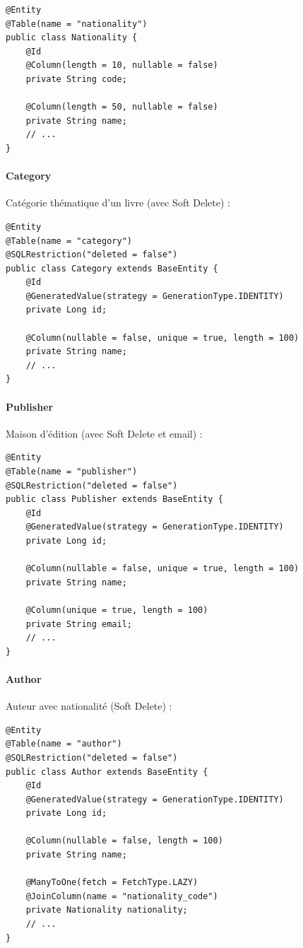 \documentclass[12pt,a4paper,twoside]{report}
\begin{document}
\begin{lstlisting}[caption=Entité Nationality]
@Entity
@Table(name = "nationality")
public class Nationality {
    @Id
    @Column(length = 10, nullable = false)
    private String code;

    @Column(length = 50, nullable = false)
    private String name;
    // ...
}
\end{lstlisting}

\paragraph{Category} Catégorie thématique d'un livre (avec Soft Delete) :

\begin{lstlisting}[caption=Entité Category]
@Entity
@Table(name = "category")
@SQLRestriction("deleted = false")
public class Category extends BaseEntity {
    @Id
    @GeneratedValue(strategy = GenerationType.IDENTITY)
    private Long id;

    @Column(nullable = false, unique = true, length = 100)
    private String name;
    // ...
}
\end{lstlisting}

\paragraph{Publisher} Maison d'édition (avec Soft Delete et email) :

\begin{lstlisting}[caption=Entité Publisher]
@Entity
@Table(name = "publisher")
@SQLRestriction("deleted = false")
public class Publisher extends BaseEntity {
    @Id
    @GeneratedValue(strategy = GenerationType.IDENTITY)
    private Long id;

    @Column(nullable = false, unique = true, length = 100)
    private String name;

    @Column(unique = true, length = 100)
    private String email;
    // ...
}
\end{lstlisting}

\paragraph{Author} Auteur avec nationalité (Soft Delete) :

\begin{lstlisting}[caption=Entité Author]
@Entity
@Table(name = "author")
@SQLRestriction("deleted = false")
public class Author extends BaseEntity {
    @Id
    @GeneratedValue(strategy = GenerationType.IDENTITY)
    private Long id;

    @Column(nullable = false, length = 100)
    private String name;

    @ManyToOne(fetch = FetchType.LAZY)
    @JoinColumn(name = "nationality_code")
    private Nationality nationality;
    // ...
}
\end{lstlisting}
\end{document}
